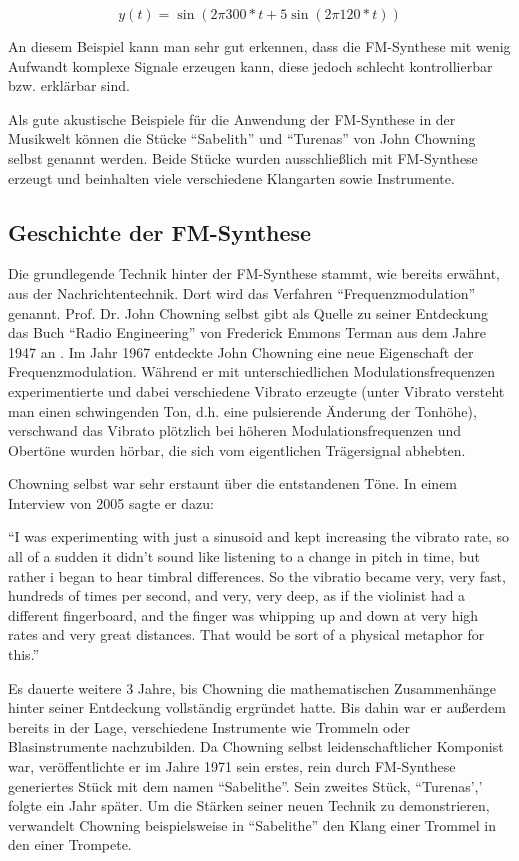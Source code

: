 \[
y(t) = \sin(2 \pi 300*t + 5 \sin(2 \pi 120*t))
\]

An diesem Beispiel kann man sehr gut erkennen, dass die FM-Synthese mit wenig Aufwandt komplexe Signale erzeugen kann, diese jedoch schlecht kontrollierbar bzw. erklärbar sind.

Als gute akustische Beispiele für die Anwendung der FM-Synthese in der Musikwelt können die Stücke ``Sabelith'' und ``Turenas'' von John Chowning selbst genannt werden. Beide Stücke wurden ausschließlich mit FM-Synthese erzeugt und beinhalten viele verschiedene Klangarten sowie Instrumente.

\FloatBarrier
\subsection{Geschichte der FM-Synthese}
Die grundlegende Technik hinter der FM-Synthese stammt, wie bereits erwähnt, aus der Nachrichtentechnik. Dort wird das Verfahren ``Frequenzmodulation'' genannt. Prof. Dr. John Chowning selbst gibt als Quelle zu seiner Entdeckung das Buch ``Radio Engineering'' von Frederick Emmons Terman aus dem Jahre 1947 an \cite[s. xy]{soundofinnovation}. Im Jahr 1967 entdeckte John Chowning eine neue Eigenschaft der Frequenzmodulation. Während er mit unterschiedlichen Modulationsfrequenzen experimentierte und dabei verschiedene Vibrato erzeugte (unter Vibrato versteht man einen schwingenden Ton, d.h. eine pulsierende Änderung der Tonhöhe), verschwand das Vibrato plötzlich bei höheren Modulationsfrequenzen und Obertöne wurden hörbar, die sich vom eigentlichen Trägersignal abhebten.\cite{fatherofdigitalmusik}

Chowning selbst war sehr erstaunt über die entstandenen Töne. In einem Interview von 2005 sagte er dazu: 

``I was experimenting with just a sinusoid and kept increasing the vibrato rate, so all of a sudden it didn't sound like listening to a change in pitch in time, but rather i began to hear timbral differences. So the vibratio became very, very fast, hundreds of times per second, and very, very deep, as if the violinist had a different fingerboard, and the finger was whipping up and down at very high rates and very great distances. That would be sort of a physical metaphor for this.''\cite[s. xy]{soundofinnovation}

Es dauerte weitere 3 Jahre, bis Chowning die mathematischen Zusammenhänge hinter seiner Entdeckung vollständig ergründet hatte. Bis dahin war er außerdem bereits in der Lage, verschiedene Instrumente wie Trommeln oder Blasinstrumente nachzubilden. Da Chowning selbst leidenschaftlicher Komponist war, veröffentlichte er im Jahre 1971 sein erstes, rein durch FM-Synthese generiertes Stück mit dem namen ``Sabelithe''. Sein zweites Stück, ``Turenas',' folgte ein Jahr später.
Um die Stärken seiner neuen Technik zu demonstrieren, verwandelt Chowning beispielsweise in ``Sabelithe'' den Klang einer Trommel in den einer Trompete.\cite[s. xy]{soundofinnovation}
 
